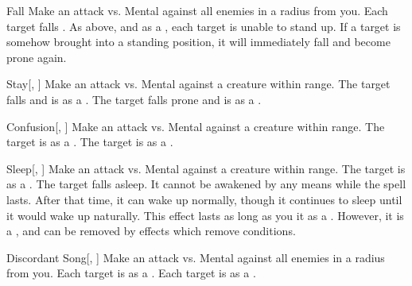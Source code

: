 \begin{ability}[\nth{1}]{Fall}
Make an attack vs. Mental against all enemies in a \areamed radius from you.
\hit Each target falls .
\crit As above, and as a , each target is unable to stand up.
If a target is somehow brought into a standing position, it will immediately fall and become prone again.
\end{ability}
\vspace{0.25em}



\begin{ability}[\nth{2}]{Stay}[, ]
Make an attack vs. Mental against a creature within \rngmed range.
\hit The target falls  and is  as a .
\crit The target falls prone and is  as a .
\end{ability}
\vspace{0.25em}



\begin{ability}[\nth{3}]{Confusion}[, ]
Make an attack vs. Mental against a creature within \rngmed range.
\hit The target is \disoriented as a .
\crit The target is \confused as a .
\end{ability}
\vspace{0.25em}



\begin{ability}[\nth{3}]{Sleep}[, ]
Make an attack vs. Mental against a creature within \rngclose range.
\hit The target is \blinded as a .
\crit The target falls asleep.
It cannot be awakened by any means while the spell lasts.
After that time, it can wake up normally, though it continues to sleep until it would wake up naturally.
This effect lasts as long as you  it as a .
However, it is a , and can be removed by effects which remove conditions.
\end{ability}
\vspace{0.25em}



\begin{ability}[\nth{4}]{Discordant Song}[, ]
Make an attack vs. Mental against all enemies in a \areamed radius from you.
\hit Each target is \disoriented as a .
\crit Each target is \confused as a .
\end{ability}
\vspace{0.25em}



